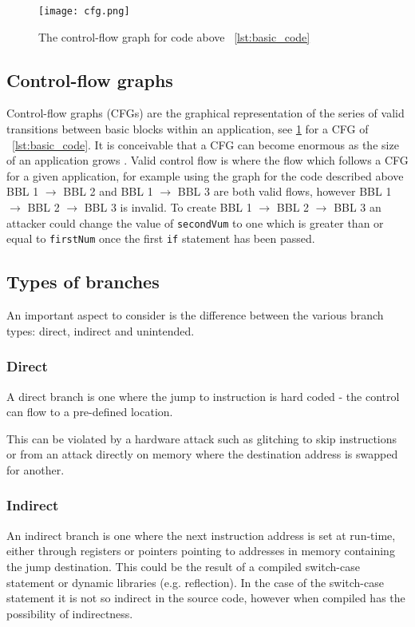 \begin{figure}
  \texttt{[image: cfg.png]}
  \caption{The control-flow graph for code above ~\ref{lst:basic_code}}
  \label{fig:basicCFG}
\end{figure}

\subsection{Control-flow graphs}
Control-flow graphs (CFGs) are the graphical representation of the series of valid transitions between basic blocks within an application, see \ref{fig:basicCFG} for a CFG of ~\ref{lst:basic_code}. It is conceivable that a CFG can become enormous as the size of an application grows . Valid control flow is where the flow which follows a CFG for a given application, for example using the graph for the code described above BBL 1 $\rightarrow$ BBL 2 and BBL 1 $\rightarrow$ BBL 3 are both valid flows, however BBL 1 $\rightarrow$ BBL 2 $\rightarrow$ BBL 3 is invalid. To create BBL 1 $\rightarrow$ BBL 2 $\rightarrow$ BBL 3 an attacker could change the value of \verb|secondVum| to one which is greater than or equal to \verb|firstNum| once the first \verb|if| statement has been passed. 

\subsection{Types of branches}
An important aspect to consider is the difference between the various branch types: direct, indirect and unintended.

\subsubsection{Direct}
A direct branch is one where the jump to instruction is hard coded - the control can flow to a pre-defined location.

This can be violated by a hardware attack such as glitching to skip instructions or from an attack directly on memory where the destination address is swapped for another.

\subsubsection{Indirect}
An indirect branch is one where the next instruction address is set at run-time, either through registers or pointers pointing to addresses in memory containing the jump destination. This could be the result of a compiled switch-case statement or dynamic libraries (e.g. reflection). In the case of the switch-case statement it is not so indirect in the source code, however when compiled has the possibility of indirectness.

